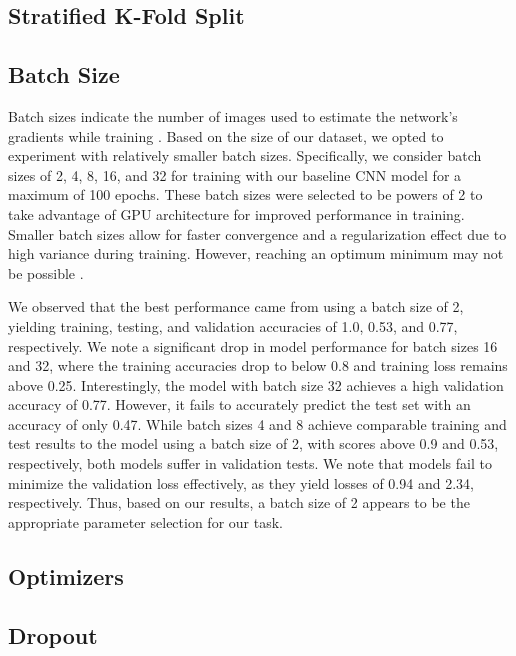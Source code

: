 \documentclass{article}
\begin{document}
\subsection{Stratified K-Fold Split}
\subsection{Batch Size}
Batch sizes indicate the number of images used to estimate the network’s gradients while training \cite{KANDEL2020312}. Based on the size of our dataset, we opted to experiment with relatively smaller batch sizes. Specifically, we consider batch sizes of 2, 4, 8, 16, and 32 for training with our baseline CNN model for a maximum of 100 epochs. These batch sizes were selected to be powers of 2 to take advantage of GPU architecture for improved performance in training. Smaller batch sizes allow for faster convergence and a regularization effect due to high variance during training. However, reaching an optimum minimum may not be possible \cite{KANDEL2020312}. 

We observed that the best performance came from using a batch size of 2, yielding training, testing, and validation accuracies of 1.0, 0.53, and 0.77, respectively. We note a significant drop in model performance for batch sizes 16 and 32, where the training accuracies drop to below 0.8 and training loss remains above 0.25. Interestingly, the model with batch size 32 achieves a high validation accuracy of 0.77. However, it fails to accurately predict the test set with an accuracy of only 0.47. While batch sizes 4 and 8 achieve comparable training and test results to the model using a batch size of 2, with scores above 0.9 and 0.53, respectively, both models suffer in validation tests. We note that models fail to minimize the validation loss effectively, as they yield losses of 0.94 and 2.34, respectively. Thus, based on our results, a batch size of 2 appears to be the appropriate parameter selection for our task.

\subsection{Optimizers}



\subsection{Dropout}
\end{document}
